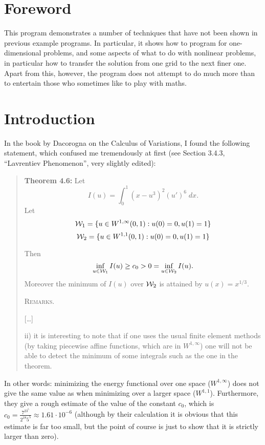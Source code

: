\documentclass{article}
\begin{document}
\section{Foreword}

This program demonstrates a number of techniques that have not been shown in
previous example programs. In particular, it shows how to program for
one-dimensional problems, and some aspects of what to do with nonlinear
problems, in particular how to transfer the solution from one grid to the next
finer one. Apart from this, however, the program does not attempt to do much
more than to entertain those who sometimes like to play with maths.

\section{Introduction}

In the book by Dacorogna on the Calculus of Variations, I found the following
statement, which confused me tremendously at first (see Section 3.4.3,
``Lavrentiev Phenomenon'', very slightly edited):

\begin{quote}
  \textbf{Theorem 4.6:} Let 
  $$I(u)=\int_0^1 (x-u^3)^2 (u')^6\; dx.$$
  Let
  $$
    {\cal W}_1 = \{ u\in W^{1,\infty}(0,1) : u(0)=0, u(1)=1 \}
    $$ $$
    {\cal W}_2 = \{ u\in W^{1,1}(0,1) : u(0)=0, u(1)=1 \}
  $$

  Then
  $$
  \inf_{u\in {\cal W}_1} I(u) \ge c_0 > 0 = \inf_{u\in {\cal W}_2} I(u).
  $$
  Moreover the minimum of $I(u)$ over ${\cal W}_2$ is attained by
  $u(x)=x^{1/3}$. 

  \textsc{Remarks.}

  [\ldots]

  ii) it is interesting to note that if one uses the usual finite element
  methods (by taking piecewise affine functions, which are in $W^{1,\infty}$)
  one will not be able to detect the minimum of some integrals such as the one
  in the theorem.
\end{quote}
In other words: minimizing the energy functional over one space
($W^{1,\infty}$) does not give the same value as when minimizing over a larger
space ($W^{1,1}$). Furthermore, they give a rough estimate of the value of the
constant $c_0$, which is $c_0=\tfrac{7^23^5}{2^{18}5^5}\approx 1.61\cdot
10^{-6}$ (although by their calculation it is obvious that this estimate is
far too small, but the point of course is just to show that it is strictly
larger than zero).
\end{document}
